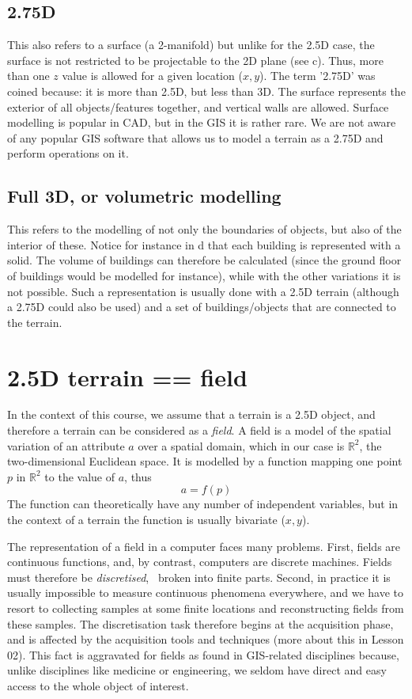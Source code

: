 \subsection{2.75D} 
This also refers to a surface (a 2-manifold) but unlike for the 2.5D case, the surface is not restricted to be projectable to the 2D plane (see c).
Thus, more than one $z$ value is allowed for a given location ($x,y$).
The term '2.75D' was coined because: it is more than 2.5D, but less than 3D.
The surface represents the exterior of all objects/features together, and vertical walls are allowed.
Surface modelling is popular in CAD, but in the GIS it is rather rare.
We are not aware of any popular GIS software that allows us to model a terrain as a 2.75D and perform operations on it.

\subsection{Full 3D, or volumetric modelling} 
This refers to the modelling of not only the boundaries of objects, but also of the interior of these.
Notice for instance in d that each building is represented with a solid.
The volume of buildings can therefore be calculated (since the ground floor of buildings would be modelled for instance), while with the other variations it is not possible. 
Such a representation is usually done with a 2.5D terrain (although a 2.75D could also be used) and a set of buildings/objects that are connected to the terrain.



%
\section{2.5D terrain == field}

In the context of this course, we assume that a terrain is a 2.5D object, and therefore a terrain can be considered as a \emph{field}.
A field is a model of the spatial variation of an attribute $a$ over a spatial domain, which in our case is $\mathbb{R}^2$, the two-dimensional Euclidean space.
It is modelled by a function mapping one point $p$ in $\mathbb{R}^2$ to the value of $a$, thus 
\[
  a = f(p)
\]
The function can theoretically have any number of independent variables, but in the context of a terrain the function is usually bivariate ($x,y$).

%

The representation of a field in a computer faces many problems. 
First, fields are continuous functions, and, by contrast, computers are discrete machines. 
Fields must therefore be \emph{discretised}, \ie\ broken into finite parts.
Second, in practice it is usually impossible to measure continuous phenomena everywhere, and we have to resort to collecting samples at some finite locations and reconstructing fields from these samples.
The discretisation task therefore begins at the acquisition phase, and is affected by the acquisition tools and techniques (more about this in Lesson 02).
This fact is aggravated for fields as found in GIS-related disciplines because, unlike disciplines like medicine or engineering, we seldom have direct and easy access to the whole object of interest.


